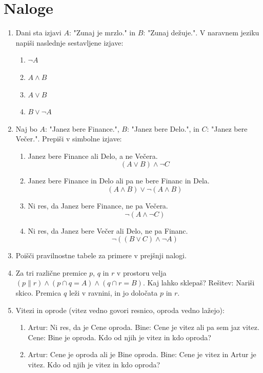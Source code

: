 \documentclass[11pt,paper=b5,DIV=13,headinclude,footinclude]{scrbook}
\begin{document}
\newpage

\section{Naloge}
\begin{enumerate}
\item Dani sta izjavi $A$: "Zunaj je mrzlo." in $B$: "Zunaj dežuje.". V naravnem jeziku napiši naslednje sestavljene izjave:
\begin{enumerate}
  \item $\neg A$
  \item $A \land B$
  \item $A \lor B$
  \item $B \lor \neg A$
\end{enumerate}

\item Naj bo $A$: "Janez bere Finance.", $B$: "Janez bere Delo.", in $C$: "Janez bere Večer.".
Prepiši v simbolne izjave:
\begin{enumerate}
  \item Janez bere Finance ali Delo, a ne Večera. \[(A \lor B) \land \neg C\]
  \item Janez bere Finance in Delo ali pa ne bere Financ in Dela. \[(A \land B) \lor \neg (A \land B)\]
  \item Ni res, da Janez bere Finance, ne pa Večera. \[\neg (A \land \neg C)\]
  \item Ni res, da Janez bere Večer ali Delo, ne pa Financ. \[\neg ((B \lor C) \land \neg A)\]
\end{enumerate}

\item Poišči pravilnostne tabele za primere v prejšnji nalogi.

\item Za tri različne premice $p$, $q$ in $r$ v prostoru velja $(p \parallel r) \land (p \cap q = A) \land (q \cap r = B)$. Kaj lahko sklepaš? Rešitev: Nariši skico. Premica $q$ leži v ravnini, in jo določata $p$ in $r$.

\item Vitezi in oprode (vitez vedno govori resnico, oproda vedno lažejo):
\begin{enumerate}
  \item Artur: Ni res, da je Cene oproda.
  Bine: Cene je vitez ali pa sem jaz vitez.
  Cene: Bine je oproda.
  Kdo od njih je vitez in kdo oproda?
  \item Artur: Cene je oproda ali je Bine oproda.
  Bine: Cene je vitez in Artur je vitez.
  Kdo od njih je vitez in kdo oproda?
\end{enumerate}


\end{enumerate}
\end{document}
